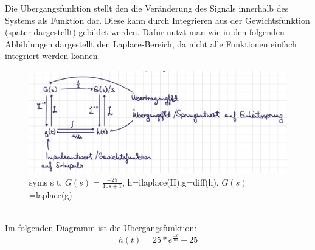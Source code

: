 Die Ubergangsfunktion stellt den die Veränderung des Signals innerhalb des Systems als Funktion dar. Diese
kann durch Integrieren aus der Gewichtsfunktion (später dargestellt) gebildet werden. Dafur nutzt man wie
in den folgenden Abbildungen dargestellt den Laplace-Bereich, da nicht alle Funktionen einfach integriert
werden können.
\begin{figure}[h]
    \begin{center}
        \includegraphics[width=13cm]{image/Screenshot 2022-12-13 161708.jpg}
    \end{center}
    \caption{syms s t, $G(s)=\frac{-25}{10s+1}$, h=ilaplace(H),g=diff(h), $G(s)$=laplace(g)}
\end{figure}
\\
Im folgenden Diagramm ist die Übergangsfunktion:
\begin{equation*}
    h(t)=25*e^{\frac{-t}{10}}-25
\end{equation*}